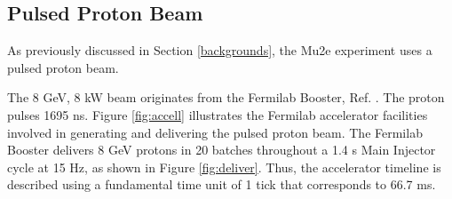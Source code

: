 \subsection{Pulsed Proton Beam}\label{pulsedprotonbeam}
As previously discussed in Section  \ref{backgrounds}, the Mu2e experiment uses a 
pulsed proton beam.

The 8 GeV, 8 kW beam originates from the Fermilab Booster, Ref. \cite{PhysRevAccelBeams.20.111003}. 
The  proton pulses  1695 ns. Figure \ref{fig:accell} 
illustrates the Fermilab accelerator facilities involved in generating and delivering 
the pulsed proton beam. The Fermilab Booster delivers 8 GeV protons in 20 batches 
throughout a 1.4 s Main Injector cycle at 15 Hz, as shown in Figure \ref{fig:deliver}. 
Thus, the accelerator timeline is described using a fundamental time unit of 1 tick that corresponds to 66.7 ms.

